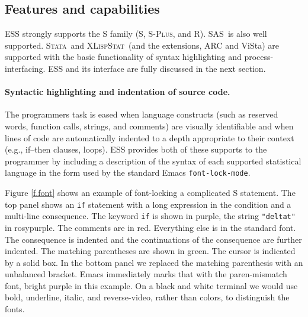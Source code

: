 \documentclass{article}
\newcommand*{\SAS}{\textsc{SAS}}
\newcommand*{\Splus}{\textsc{S-Plus}}
\newcommand*{\XLispStat}{\textsc{XLispStat}}
\newcommand*{\Stata}{\textsc{Stata}}
\newcommand{\stexttt}[1]{{\small\texttt{#1}}}
\begin{document}


\subsection{Features and capabilities}
\label{sec:ESS:features}

ESS strongly supports the S family (S, \Splus, and R).
\SAS\ is also well supported.  \Stata\
and \XLispStat\ (and the extensions, ARC and ViSta) are
supported with the basic functionality of syntax highlighting and
process-interfacing.  ESS and its interface are fully discussed in the
next section.

\paragraph{Syntactic highlighting and indentation of source code.}
The programmers task is eased when language constructs (such as
reserved words, function calls, strings, and comments) are visually
identifiable and when lines of code are automatically indented to a
depth appropriate to their context (e.g., if--then clauses, loops).
ESS provides both of these supports to the programmer by
including a description of the syntax of each
supported statistical language in the form used by the standard Emacs
\stexttt{font-lock-mode}.  

Figure \ref{f.font} shows an example of font-locking a
complicated S statement.  The top panel shows an \stexttt{if}
statement with a long expression in the condition and a multi-line
consequence.  The keyword \stexttt{if} is shown in purple,
the string \stexttt{"deltat"} in rosypurple.  The
comments are in red.  Everything else is in the standard
font.  The consequence is indented and the continuations of the
consequence are further indented.  The matching parentheses are shown
in green.  The cursor is indicated
by a solid box.  In the bottom panel we replaced the matching
parenthesis with an unbalanced bracket.  Emacs immediately marks that
with the paren-mismatch font, bright purple in this example.
On a black and white terminal we would use bold, underline, italic,
and reverse-video, rather than colors, to distinguish the fonts.
\end{document}
